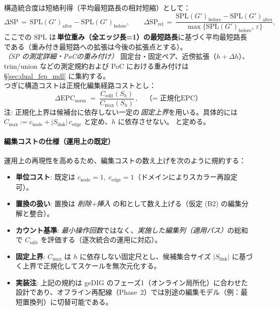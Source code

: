 \documentclass[ja=standard,xelatex]{bxjsarticle}
\newcommand{\gednorm}{\Delta\mathrm{EPC}_{\mathrm{norm}}}
\begin{document}
構造統合度は短絡利得（平均最短路長の相対短縮）として：
\begin{equation}
  \Delta \mathrm{SP}\,=\,\mathrm{SPL}(G')_{\text{after}}-\mathrm{SPL}(G')_{\text{before}},\qquad
  \Delta \mathrm{SP}_{\mathrm{rel}}\,=\,\frac{\mathrm{SPL}(G')_{\text{before}}-\mathrm{SPL}(G')_{\text{after}}}{\max\{\mathrm{SPL}(G')_{\text{before}},\,\varepsilon\}},\label{eq:dsp_rel}
\end{equation}
\noindent ここでの $\mathrm{SPL}$ は\,\textbf{単位重み（全エッジ長=1）の最短路長}に基づく平均最短路長である（重み付き最短路への拡張は今後の拡張点とする）。
\\
\noindent\textit{（SP の測定詳細・PoCの重み付け）}\; 固定台・固定ペア、近傍拡張（$h{+}\Delta h$）、trim/union などの測定規約および PoC における重み付けは \S\ref{sec:dual_fep_mdl} に集約する。
\\
つぎに構造コストは正規化編集経路コストとし：
\begin{equation}
  \gednorm\;=\;\frac{C_{\mathrm{edit}}(S_h)}{C_{\max}(S_h)}\!\,,\label{eq:ged_norm}\quad \text{（= 正規化EPC）}
\end{equation}
\noindent 注: \;正規化上界は候補台に依存しない一定の\,\emph{固定上界}を用いる。具体的には $C_{\max}:=c_{\mathrm{node}}+|S_{\mathrm{link}}|\,c_{\mathrm{edge}}$ と定め、$h$ に依存させない。
と定める。

\paragraph{編集コストの仕様（運用上の既定）}
運用上の再現性を高めるため、編集コストの数え上げを次のように規約する：
\begin{itemize}[leftmargin=1.6em]
  \item \textbf{単位コスト}: 既定は $c_{\mathrm{node}}{=}1,\;c_{\mathrm{edge}}{=}1$（ドメインによりスカラー再設定可）。
  \item \textbf{置換の扱い}: 置換は \emph{削除+挿入} の和として数え上げる（仮定 (B2) の編集分解と整合）。
  \item \textbf{カウント基準}: \emph{最小操作回数}ではなく、\emph{実施した編集列（適用パス）}の総和で $C_{\mathrm{edit}}$ を評価する（逐次統合の運用に対応）。
  \item \textbf{固定上界}: $C_{\max}$ は $h$ に依存しない固定尺とし、候補集合サイズ $|S_{\mathrm{link}}|$ に基づく上界で正規化してスケールを無次元化する。
  \item \textbf{実装注}: 上記の規約は geDIG のフェーズ1（オンライン局所化）に合わせた設計であり、オフライン再配線（Phase~2）では別途の編集モデル（例：最短置換列）に切替可能である。
\end{itemize}
\end{document}

